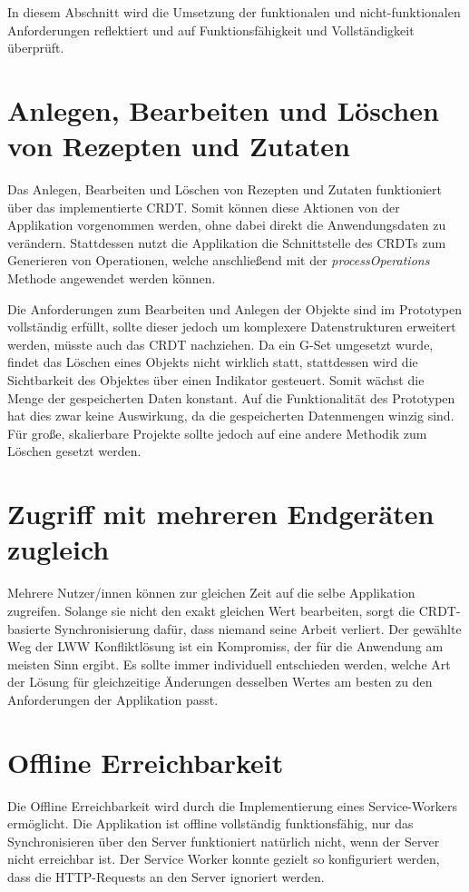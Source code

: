 \documentclass[a4paper, 12pt]{scrreprt}
\begin{document}
In diesem Abschnitt wird die Umsetzung der funktionalen und nicht-funktionalen Anforderungen reflektiert und auf Funktionsfähigkeit und Vollständigkeit überprüft.

\section{Anlegen, Bearbeiten und Löschen von Rezepten und Zutaten}
Das Anlegen, Bearbeiten und Löschen von Rezepten und Zutaten funktioniert über das implementierte CRDT. Somit können diese Aktionen von der Applikation vorgenommen werden, ohne dabei direkt die Anwendungsdaten zu verändern. Stattdessen nutzt die Applikation die Schnittstelle des \acp{CRDT} zum Generieren von Operationen, welche anschließend mit der \textit{processOperations} Methode angewendet werden können.

Die Anforderungen zum Bearbeiten und Anlegen der Objekte sind im Prototypen vollständig erfüllt, sollte dieser jedoch um komplexere Datenstrukturen erweitert werden, müsste auch das CRDT nachziehen. Da ein \ac{G-Set} umgesetzt wurde, findet das Löschen eines Objekts nicht wirklich statt, stattdessen wird die Sichtbarkeit des Objektes über einen Indikator gesteuert. Somit wächst die Menge der gespeicherten Daten konstant. Auf die Funktionalität des Prototypen hat dies zwar keine Auswirkung, da die gespeicherten Datenmengen winzig sind. Für große, skalierbare Projekte sollte jedoch auf eine andere Methodik zum Löschen gesetzt werden.

\section{Zugriff mit mehreren Endgeräten zugleich}
Mehrere Nutzer/innen können zur gleichen Zeit auf die selbe Applikation zugreifen. Solange sie nicht den exakt gleichen Wert bearbeiten, sorgt die CRDT-basierte Synchronisierung dafür, dass niemand seine Arbeit verliert. Der gewählte Weg der \ac{LWW} Konfliktlösung ist ein Kompromiss, der für die Anwendung am meisten Sinn ergibt. Es sollte immer individuell entschieden werden, welche Art der Lösung für gleichzeitige Änderungen desselben Wertes am besten zu den Anforderungen der Applikation passt.

\section{Offline Erreichbarkeit}
Die Offline Erreichbarkeit wird durch die Implementierung eines Service-Workers ermöglicht. Die Applikation ist offline vollständig funktionsfähig, nur das Synchronisieren über den Server funktioniert natürlich nicht, wenn der Server nicht erreichbar ist. Der Service Worker konnte gezielt so konfiguriert werden, dass die \ac{HTTP}-Requests an den Server ignoriert werden.
\end{document}
